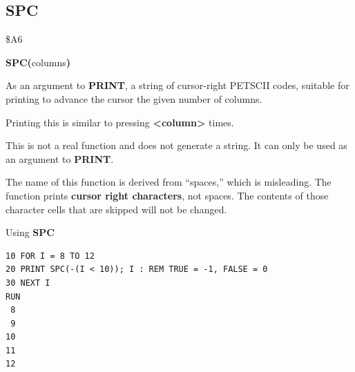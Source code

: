 \subsection{SPC}
\begin{description}[leftmargin=2cm,style=nextline]
\item [Token:]    \$A6

\item [Format:]   {\bf SPC(}columns{\bf)}

\item [Returns:]  As an argument to {\bf PRINT}, a string of cursor-right PETSCII codes, suitable for printing to advance the cursor the given number of columns.

                  Printing this is similar to pressing \megakey{$\rightarrow$} {\bf <column>} times.

                  This is not a real function and does not generate a string. It can only be used as an argument to {\bf PRINT}.

\item [Remarks:]  The name of this function is derived from ``spaces,'' which is misleading. The function prints {\bf cursor right characters}, not spaces. The contents of those character cells that are skipped will not be changed.

\item [Example:]  Using {\bf SPC}

\begin{tcolorbox}[colback=black,coltext=white]
\verbatimfont{\codefont}
\begin{verbatim}
10 FOR I = 8 TO 12
20 PRINT SPC(-(I < 10)); I : REM TRUE = -1, FALSE = 0
30 NEXT I
RUN
 8
 9
10
11
12
\end{verbatim}
\end{tcolorbox}
\end{description}


\newpage
